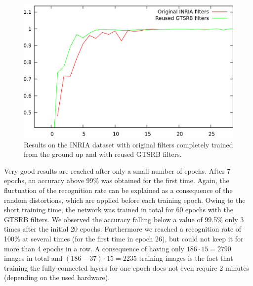 \documentclass[11pt, a4paper]{article}
\begin{document}
\begin{figure}[h!]
	\centering
	\includegraphics[width=1\textwidth]{inria_results.png}
	\caption{Results on the INRIA dataset with original filters completely trained from the ground up and with reused GTSRB filters.}
	\label{fig:inria_results}
\end{figure}

Very good results are reached after only a small number of epochs. After 7 epochs, an accuracy above 99\% was obtained for the first time. Again, the fluctuation of the recognition rate can be explained as a consequence of the random distortions, which are applied before each training epoch. Owing to the short training time, the network was trained in total for 60 epochs with the GTSRB filters. We observed the accuracy falling below a value of 99.5\% only 3 times after the initial 20 epochs. Furthermore we reached a recognition rate of 100\% at several times (for the first time in epoch 26), but could not keep it for more than 4 epochs in a row.
A consequence of having only $186 \cdot 15 = 2790$ images in total and $(186 - 37) \cdot 15 = 2235$ training images is the fact that training the fully-connected layers for one epoch does not even require 2 minutes (depending on the used hardware).
\end{document}
